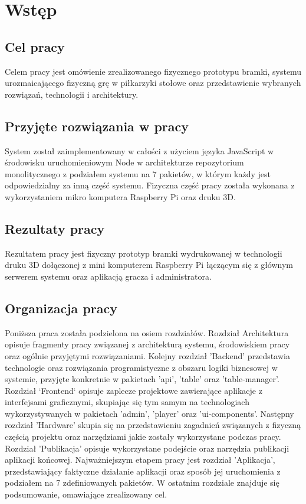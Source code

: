 \chapter{Wstęp}
\label{ch:funplenop}

\section{Cel pracy}
Celem pracy jest omówienie zrealizowanego fizycznego prototypu bramki, systemu urozmaicającego fizyczną grę w piłkarzyki stołowe oraz przedstawienie wybranych rozwiązań, technologii i architektury.

\section{Przyjęte rozwiązania w pracy}
System został zaimplementowany w całości z użyciem języka JavaScript w środowisku uruchomieniowym Node w architekturze repozytorium monolitycznego z podziałem systemu na 7 pakietów, w którym każdy jest odpowiedzialny za inną część systemu. Fizyczna część pracy została wykonana z wykorzystaniem mikro komputera Raspberry Pi oraz druku 3D.

\section{Rezultaty pracy}
Rezultatem pracy jest fizyczny prototyp bramki wydrukowanej w technologii druku 3D dołączonej z mini komputerem Raspberry Pi łączącym się z głównym serwerem systemu oraz aplikacją gracza i administratora.

\section{Organizacja pracy}
Poniższa praca została podzielona na osiem rozdziałów. Rozdział Architektura opisuje fragmenty pracy związanej z architekturą systemu, środowiskiem pracy oraz ogólnie przyjętymi rozwiązaniami. 
Kolejny rozdział 'Backend' przedstawia technologie oraz rozwiązania programistyczne z obszaru logiki biznesowej w systemie, przyjęte konkretnie w pakietach 'api', 'table' oraz 'table-manager'.
Rozdział `Frontend` opisuje zaplecze projektowe zawierające aplikacje z interfejsami graficznymi, skupiając się tym samym na technologiach wykorzystywanych w pakietach 'admin', 'player' oraz 'ui-components'.
Następny rozdział 'Hardware' skupia się na przedstawieniu zagadnień związanych z fizyczną częścią projektu oraz narzędziami jakie zostały wykorzystane podczas pracy.
Rozdział 'Publikacja' opisuje wykorzystane podejście oraz narzędzia publikacji aplikacji końcowej.
Najważniejszym etapem pracy jest rozdział 'Aplikacja', przedstawiający faktyczne działanie aplikacji oraz sposób jej uruchomienia z podziałem na 7 zdefiniowanych pakietów.
W ostatnim rozdziale znajduje się podsumowanie, omawiające zrealizowany cel.
